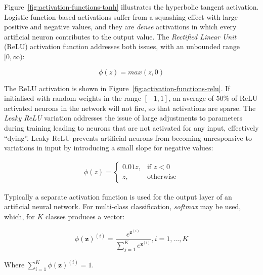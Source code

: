 Figure~\ref{fig:activation-functions-tanh} illustrates the hyperbolic tangent activation. Logistic function-based activations suffer from a squashing effect with large positive and negative values, and they are \emph{dense} activations in which every artificial neuron contributes to the output value. The \emph{Rectified Linear Unit} (ReLU) activation function addresses both issues, with an unbounded range $[0,\infty)$:

\begin{equation}
  \phi(z) = max(z, 0)
\end{equation}

The ReLU activation is shown in Figure~\ref{fig:activation-functions-relu}. If initialised with random weights in the range $[-1,1]$, an average of 50\% of ReLU activated neurons in the network will not fire, so that activations are sparse.
The \emph{Leaky ReLU} variation addresses the issue of large adjustments to parameters during training leading to neurons that are not activated for any input, effectively ``dying''. Leaky ReLU prevents artificial neurons from becoming unresponsive to variations in input by introducing a small slope for negative values:

\begin{align}
  \phi(z) =
    \begin{cases}
      0.01z, & \text{if } z < 0\\
      z, & \text{otherwise}
    \end{cases}
\end{align}

Typically a separate activation function is used for the output layer of an artificial neural network. For multi-class classification, \emph{softmax} may be used, which, for $K$ classes produces a vector:

\begin{equation}
  \phi(\bm{z})^{(i)} = \frac{e^{\bm{z}^{(i)}}}{\sum_{j=1}^{K} e^{\bm{z}^{(i)}}}, i = 1, \ldots, K
\end{equation}

Where $\sum_{i=1}^{K} \phi (\bm{z})^{(i)} = 1$.

